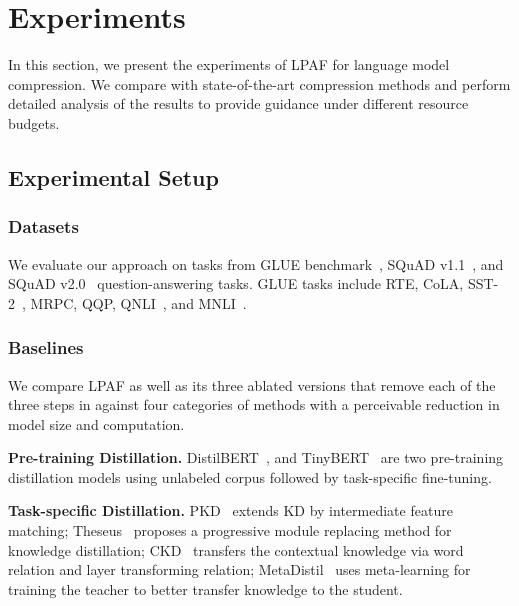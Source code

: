 \section{Experiments}
In this section, we present the experiments of LPAF for language model compression. We compare with state-of-the-art compression methods and perform detailed analysis of the results to provide guidance under different resource budgets.

\subsection{Experimental Setup}
\subsubsection{Datasets} 
We evaluate our approach on tasks from GLUE benchmark~\cite{glue}, SQuAD v1.1~\cite{qnliandsquad}, and SQuAD v2.0~\cite{squadv2.0} question-answering tasks. GLUE tasks include RTE, CoLA, SST-2~\cite{sst2}, MRPC, QQP, QNLI~\cite{mrpc}, and MNLI~\cite{mnli}.




\subsubsection{Baselines} We compare LPAF as well as its three ablated versions that remove each of the three steps in  against four categories of methods with a perceivable reduction in model size and computation.

\textbf{Pre-training Distillation. }DistilBERT~\cite{distilbert}, and TinyBERT~\cite{tinybert} are two pre-training distillation models using unlabeled corpus followed by task-specific fine-tuning.

\textbf{Task-specific Distillation. }PKD~\cite{pkd} extends KD by intermediate feature matching;
Theseus~\cite{theseus} proposes a progressive module replacing method for knowledge
distillation; CKD~\cite{CKD} transfers the contextual knowledge via word relation and layer transforming relation; MetaDistil~\cite{metadistil} uses meta-learning for training the teacher to better transfer knowledge to the student.

